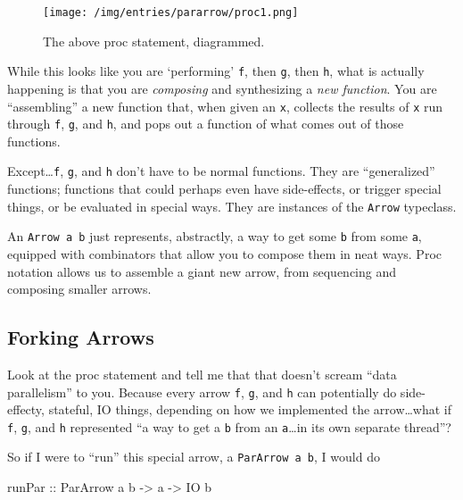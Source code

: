 \documentclass[]{article}
\newenvironment{Shaded}{}{}
\newcommand{\DataTypeTok}[1]{\textcolor[rgb]{0.56,0.13,0.00}{#1}}
\newcommand{\NormalTok}[1]{#1}
\newcommand{\OtherTok}[1]{\textcolor[rgb]{0.00,0.44,0.13}{#1}}
\begin{document}
\begin{figure}
\centering
\texttt{[image: /img/entries/pararrow/proc1.png]}
\caption{The above proc statement, diagrammed.}
\end{figure}

While this looks like you are `performing' \texttt{f}, then \texttt{g}, then
\texttt{h}, what is actually happening is that you are \emph{composing} and
synthesizing a \emph{new function}. You are ``assembling'' a new function that,
when given an \texttt{x}, collects the results of \texttt{x} run through
\texttt{f}, \texttt{g}, and \texttt{h}, and pops out a function of what comes
out of those functions.

Except\ldots{}\texttt{f}, \texttt{g}, and \texttt{h} don't have to be normal
functions. They are ``generalized'' functions; functions that could perhaps even
have side-effects, or trigger special things, or be evaluated in special ways.
They are instances of the \texttt{Arrow} typeclass.

An \texttt{Arrow\ a\ b} just represents, abstractly, a way to get some
\texttt{b} from some \texttt{a}, equipped with combinators that allow you to
compose them in neat ways. Proc notation allows us to assemble a giant new
arrow, from sequencing and composing smaller arrows.

\hypertarget{forking-arrows}{%
\subsection{Forking Arrows}\label{forking-arrows}}

Look at the proc statement and tell me that that doesn't scream ``data
parallelism'' to you. Because every arrow \texttt{f}, \texttt{g}, and \texttt{h}
can potentially do side-effecty, stateful, IO things, depending on how we
implemented the arrow\ldots what if \texttt{f}, \texttt{g}, and \texttt{h}
represented ``a way to get a \texttt{b} from an \texttt{a}\ldots in its own
separate thread''?

So if I were to ``run'' this special arrow, a \texttt{ParArrow\ a\ b}, I would
do

\begin{Shaded}
\begin{Highlighting}[]
\OtherTok{runPar ::} \DataTypeTok{ParArrow}\NormalTok{ a b }\OtherTok{{-}>}\NormalTok{ a }\OtherTok{{-}>} \DataTypeTok{IO}\NormalTok{ b}
\end{Highlighting}
\end{Shaded}
\end{document}
